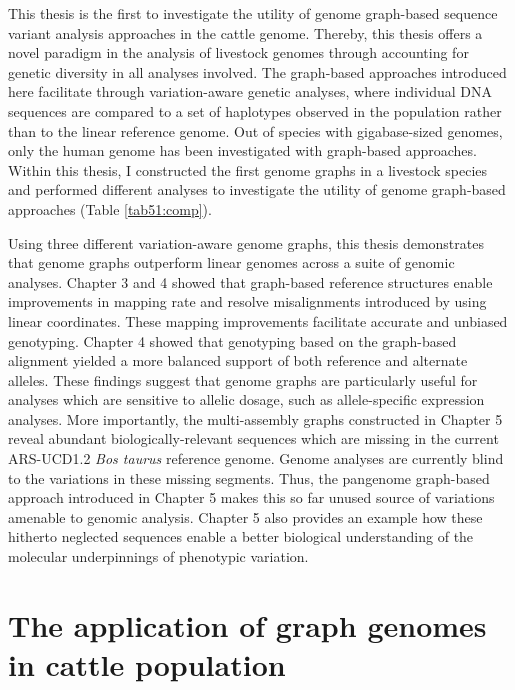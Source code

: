 \documentclass[../main.tex]{subfiles}
\begin{document}
\fi


\graphicspath{{figure/}{../figure/}}

\clearpage
\onehalfspacing

\linespread{1.25}
\setlength{\parskip}{\baselineskip}

\normalsize

This thesis is the first to investigate the utility of genome graph-based sequence variant analysis approaches in the cattle genome. Thereby, this thesis offers a novel paradigm in the analysis of livestock genomes through accounting for genetic diversity in all analyses involved. The graph-based approaches introduced here facilitate through variation-aware genetic analyses, where individual DNA sequences are compared to a set of haplotypes observed in the population rather than to the linear reference genome. Out of species with gigabase-sized genomes, only the human genome has been investigated with graph-based approaches. Within this thesis, I constructed the first genome graphs in a livestock species and performed different analyses to investigate the utility of genome graph-based approaches (Table \ref{tab51:comp}).


Using three different variation-aware genome graphs, this thesis demonstrates that genome graphs outperform linear genomes across a suite of genomic analyses. Chapter 3 and 4 showed that graph-based reference structures enable improvements in mapping rate and resolve misalignments introduced by using linear coordinates. These mapping improvements facilitate accurate and unbiased genotyping. Chapter 4 showed that genotyping based on the graph-based alignment yielded a more balanced support of both reference and alternate alleles. These findings suggest that  genome graphs are particularly useful for analyses which are sensitive to allelic dosage, such as allele-specific expression analyses. More importantly, the multi-assembly graphs constructed in Chapter 5 reveal abundant biologically-relevant sequences which are missing in the current ARS-UCD1.2 \emph{Bos taurus} reference genome. Genome analyses are currently blind to the variations in these missing segments. Thus, the pangenome graph-based approach introduced in Chapter 5 makes this so far unused source of variations amenable to genomic analysis. Chapter 5 also provides an example how these hitherto neglected sequences enable a better biological understanding of the molecular underpinnings of phenotypic variation. 

\section{The application of graph genomes in cattle population}
\end{document}
